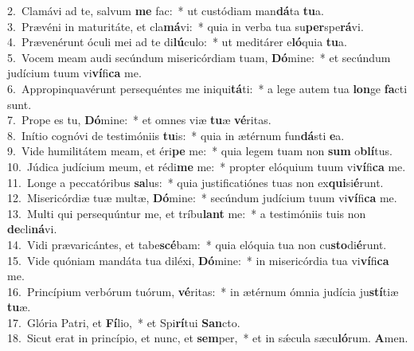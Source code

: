 {2.~}Clamávi ad te, salvum \textbf{me} fac:~* ut custódiam man\textbf{dá}ta \textbf{tu}a.\\
{3.~}Prævéni in maturitáte, et cla\textbf{má}vi:~* quia in verba tua su\textbf{per}spe\textbf{rá}vi.\\
{4.~}Prævenérunt óculi mei ad te di\textbf{lú}culo:~* ut meditárer e\textbf{ló}quia \textbf{tu}a.\\
{5.~}Vocem meam audi secúndum misericórdiam tuam, \textbf{Dó}mine:~* et secúndum judícium tuum vi\textbf{ví}fi\textbf{ca} me.\\
{6.~}Appropinquavérunt persequéntes me iniqui\textbf{tá}ti:~* a lege autem tua \textbf{lon}ge \textbf{fa}cti sunt.\\
{7.~}Prope es tu, \textbf{Dó}mine:~* et omnes viæ \textbf{tu}æ \textbf{vé}ritas.\\
{8.~}Inítio cognóvi de testimóniis \textbf{tu}is:~* quia in ætérnum fun\textbf{dá}sti \textbf{e}a.\\
{9.~}Vide humilitátem meam, et éri\textbf{pe} me:~* quia legem tuam non \textbf{sum} o\textbf{blí}tus.\\
{10.~}Júdica judícium meum, et rédi\textbf{me} me:~* propter elóquium tuum vi\textbf{ví}fi\textbf{ca} me.\\
{11.~}Longe a peccatóribus \textbf{sa}lus:~* quia justificatiónes tuas non ex\textbf{qui}si\textbf{é}runt.\\
{12.~}Misericórdiæ tuæ multæ, \textbf{Dó}mine:~* secúndum judícium tuum vi\textbf{ví}fi\textbf{ca} me.\\
{13.~}Multi qui persequúntur me, et tríbu\textbf{lant} me:~* a testimóniis tuis non \textbf{de}cli\textbf{ná}vi.\\
{14.~}Vidi prævaricántes, et tabe\textbf{scé}bam:~* quia elóquia tua non cu\textbf{sto}di\textbf{é}runt.\\
{15.~}Vide quóniam mandáta tua diléxi, \textbf{Dó}mine:~* in misericórdia tua vi\textbf{ví}fi\textbf{ca} me.\\
{16.~}Princípium verbórum tuórum, \textbf{vé}ritas:~* in ætérnum ómnia judícia ju\textbf{stí}tiæ \textbf{tu}æ.\\
{17.~}Glória Patri, et \textbf{Fí}lio,~* et Spi\textbf{rí}tui \textbf{San}cto.\\
{18.~}Sicut erat in princípio, et nunc, et \textbf{sem}per,~* et in sǽcula sæcu\textbf{ló}rum. \textbf{A}men.\\
